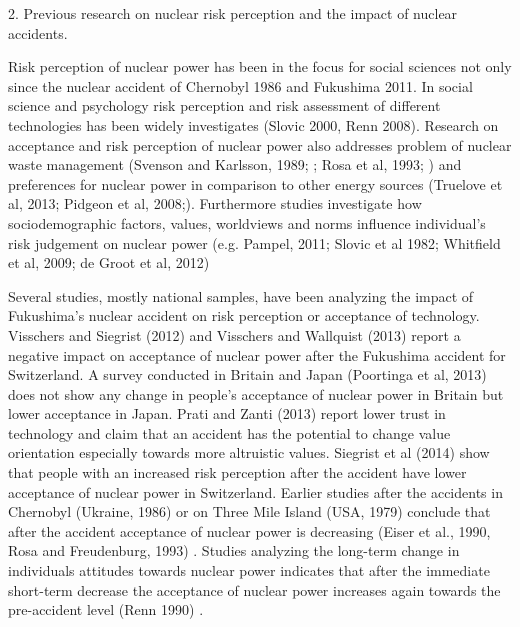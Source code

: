 



2. Previous research on nuclear risk perception and the impact of nuclear accidents.

Risk perception  of nuclear power has been in the focus for social sciences not only since the nuclear accident of Chernobyl 1986 and Fukushima 2011. In social science and psychology risk perception and risk assessment of different technologies has been widely investigates (Slovic 2000, Renn 2008). Research on acceptance and risk perception of nuclear power also addresses problem of nuclear waste management (Svenson and Karlsson, 1989; \citep{Svenson:1989up}; Rosa et al, 1993;  ) and preferences for nuclear power in comparison to other energy sources (Truelove et al, 2013; Pidgeon et al, 2008;). Furthermore studies investigate how sociodemographic factors, values, worldviews and norms influence individual's risk judgement on nuclear power (e.g. Pampel, 2011; Slovic et al 1982; Whitfield et al, 2009; de Groot et al, 2012)    
 
Several studies, mostly national samples, have been analyzing the impact of Fukushima's nuclear accident on risk perception or acceptance of technology. Visschers and Siegrist (2012) and Visschers and Wallquist (2013) \citep{Visschers:2012bf,Visschers:2013ee}  report a negative impact on acceptance of nuclear power after the Fukushima accident for Switzerland. A survey conducted in Britain and Japan (Poortinga et al, 2013) \citep{Poortinga:2013gt} does not show any change in people's acceptance of nuclear power in Britain but lower acceptance in Japan. Prati and Zanti (2013) \citep{Prati:2013jc} report lower trust in technology and claim that an accident has the potential to change value orientation especially towards more altruistic values.
Siegrist et al (2014) \citep{Siegrist:2014ji} show that people with an increased risk perception after the accident have lower acceptance of nuclear power in Switzerland. 
Earlier studies after the accidents in Chernobyl (Ukraine, 1986) or on Three Mile Island (USA, 1979) conclude that after the accident acceptance of nuclear power is decreasing (Eiser et al., 1990, Rosa and Freudenburg, 1993) \citep{RichardEiser:1990iw, Rosa:1993uj}. Studies analyzing the long-term change in individuals attitudes towards nuclear power indicates that after the immediate short-term decrease the acceptance of nuclear power increases again towards the pre-accident level (Renn 1990) \citep{Renn:1990kf}.  



